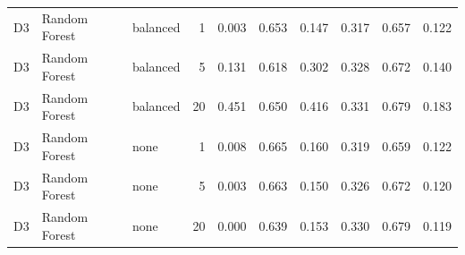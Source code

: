 \begin{table}[t]
{\begin{tabular}{lllrrrrrrr}
D3 & Random Forest & balanced & 1 & 0.003 & 0.653 & 0.147 & 0.317 & 0.657 & 0.122 \\
D3 & Random Forest & balanced & 5 & 0.131 & 0.618 & 0.302 & 0.328 & 0.672 & 0.140 \\
D3 & Random Forest & balanced & 20 & 0.451 & 0.650 & 0.416 & 0.331 & 0.679 & 0.183 \\
D3 & Random Forest & none & 1 & 0.008 & 0.665 & 0.160 & 0.319 & 0.659 & 0.122 \\
D3 & Random Forest & none & 5 & 0.003 & 0.663 & 0.150 & 0.326 & 0.672 & 0.120 \\
D3 & Random Forest & none & 20 & 0.000 & 0.639 & 0.153 & 0.330 & 0.679 & 0.119 \\
\bottomrule
\end{tabular}}
\end{table}
